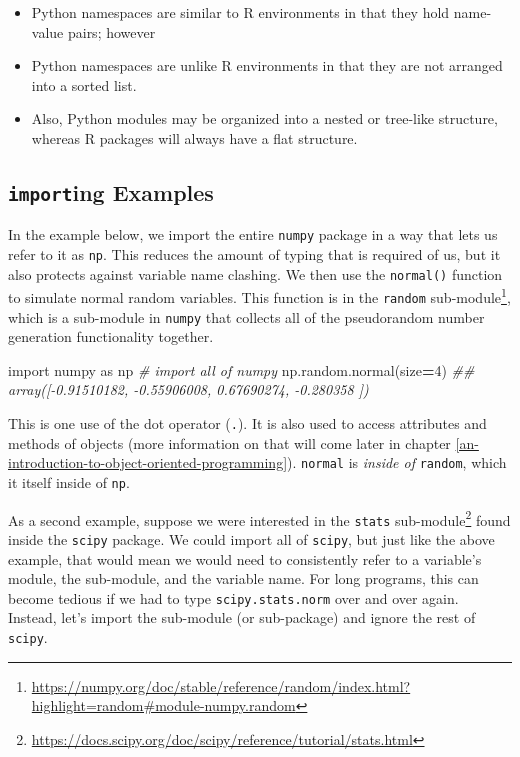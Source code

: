 \documentclass[12pt,krantz2]{krantz}
\makeatletter
\newenvironment{Shaded}{\begin{snugshade}}{\end{snugshade}}
\newcommand{\CommentTok}[1]{\textcolor[rgb]{0.37,0.37,0.37}{\textit{#1}}}
\newcommand{\DecValTok}[1]{\textcolor[rgb]{0.06,0.06,0.06}{#1}}
\newcommand{\ImportTok}[1]{#1}
\newcommand{\NormalTok}[1]{#1}
\newcommand{\OperatorTok}[1]{\textcolor[rgb]{0.43,0.43,0.43}{\textbf{#1}}}
\providecommand{\tightlist}{%
  \setlength{\itemsep}{0pt}\setlength{\parskip}{0pt}}
\renewcommand{\href}[2]{#2\footnote{\url{#1}}}
\newenvironment{kframe}{%
\medskip{}
\setlength{\fboxsep}{.8em}
 \def\at@end@of@kframe{}%
 \ifinner\ifhmode%
  \def\at@end@of@kframe{\end{minipage}}%
  \begin{minipage}{\columnwidth}%
 \fi\fi%
 \def\FrameCommand##1{\hskip\@totalleftmargin \hskip-\fboxsep
 \colorbox{shadecolor}{##1}\hskip-\fboxsep
     \hskip-\linewidth \hskip-\@totalleftmargin \hskip\columnwidth}%
 \MakeFramed {\advance\hsize-\width
   \@totalleftmargin\z@ \linewidth\hsize
   \@setminipage}}%
 {\par\unskip\endMakeFramed%
 \at@end@of@kframe}
\renewenvironment{Shaded}{\begin{kframe}}{\end{kframe}}
\makeatother
\begin{document}
\begin{rmd-details}
\begin{itemize}
\tightlist
\item
  Python namespaces are similar to R environments in that they hold name-value pairs; however
\item
  Python namespaces are unlike R environments in that they are not arranged into a sorted list.
\item
  Also, Python modules may be organized into a nested or tree-like structure, whereas R packages will always have a flat structure.
\end{itemize}


\end{rmd-details}

\hypertarget{importing-examples}{%
\subsection{\texorpdfstring{\texttt{import}ing Examples}{importing Examples}}\label{importing-examples}}

In the example below, we import the entire \texttt{numpy} package in a way that lets us refer to it as \texttt{np}. This reduces the amount of typing that is required of us, but it also protects against variable name clashing. We then use the \texttt{normal()} function to simulate normal random variables. This function is in the \href{https://numpy.org/doc/stable/reference/random/index.html?highlight=random\#module-numpy.random}{\texttt{random} sub-module}, which is a sub-module in \texttt{numpy} that collects all of the pseudorandom number generation functionality together.

\begin{Shaded}
\begin{Highlighting}[]
\ImportTok{import}\NormalTok{ numpy }\ImportTok{as}\NormalTok{ np }\CommentTok{# import all of numpy}
\NormalTok{np.random.normal(size}\OperatorTok{=}\DecValTok{4}\NormalTok{)}
\CommentTok{## array([-0.91510182, -0.55906008,  0.67690274, -0.280358  ])}
\end{Highlighting}
\end{Shaded}

This is one use of the dot operator (\texttt{.}). It is also used to access attributes and methods of objects (more information on that will come later in chapter \ref{an-introduction-to-object-oriented-programming}). \texttt{normal} is \emph{inside of} \texttt{random}, which it itself inside of \texttt{np}.

As a second example, suppose we were interested in the \href{https://docs.scipy.org/doc/scipy/reference/tutorial/stats.html}{\texttt{stats} sub-module} found inside the \texttt{scipy} package. We could import all of \texttt{scipy}, but just like the above example, that would mean we would need to consistently refer to a variable's module, the sub-module, and the variable name. For long programs, this can become tedious if we had to type \texttt{scipy.stats.norm} over and over again. Instead, let's import the sub-module (or sub-package) and ignore the rest of \texttt{scipy}.
\end{document}
